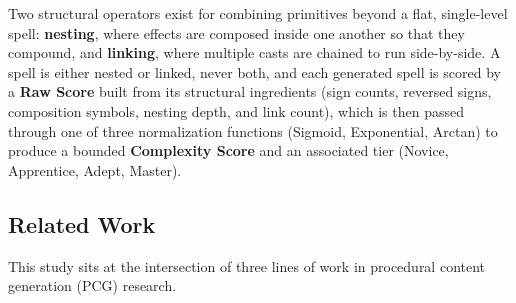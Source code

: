 \documentclass[]{article}
\begin{document}
        Two structural operators exist for combining primitives beyond a flat, single-level spell: \textbf{nesting}, where effects are composed inside one another so that they compound, and \textbf{linking}, where multiple casts are chained to run side-by-side. A spell is either nested or linked, never both, and each generated spell is scored by a \textbf{Raw Score} built from its structural ingredients (sign counts, reversed signs, composition symbols, nesting depth, and link count), which is then passed through one of three normalization functions (Sigmoid, Exponential, Arctan) to produce a bounded \textbf{Complexity Score} and an associated tier (Novice, Apprentice, Adept, Master).

        \subsection{Related Work}\label{related-work}

        This study sits at the intersection of three lines of work in procedural content generation (PCG) research.
\end{document}
